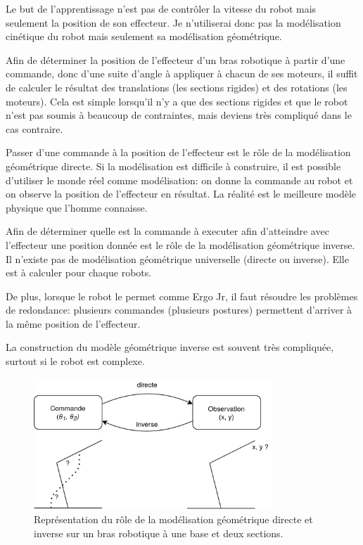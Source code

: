 \documentclass[11pt,french]{report}
\begin{document}
Le but de l'apprentissage n'est pas de contrôler la vitesse du robot mais seulement la position de son effecteur.
Je n'utiliserai donc pas la modélisation cinétique du robot mais seulement sa modélisation géométrique.

\phantom{INVISIBLE LINE}

Afin de déterminer la position de l'effecteur d'un bras robotique à partir d'une commande, donc d'une suite d'angle à appliquer à chacun de ses moteurs, il suffit de calculer le résultat des translations (les sections rigides) et des rotations (les moteurs).
Cela est simple lorsqu'il n'y a que des sections rigides et que le robot n'est pas soumis à beaucoup de contraintes, mais deviens très compliqué dans le cas contraire.

Passer d'une commande à la position de l'effecteur est le rôle de la modélisation géométrique directe.
Si la modélisation est difficile à construire, il est possible d'utiliser le monde réel comme modélisation: on donne la commande au robot et on observe la position de l'effecteur en résultat.
La réalité est le meilleure modèle physique que l'homme connaisse.

\phantom{INVISIBLE LINE}

Afin de déterminer quelle est la commande à executer afin d'atteindre avec l'effecteur une position donnée est le rôle de la modélisation géométrique inverse.
Il n'existe pas de modélisation géométrique universelle (directe ou inverse).
Elle est à calculer pour chaque robots.

De plus, lorsque le robot le permet comme Ergo Jr, il faut résoudre les problèmes de redondance: plusieurs commandes (plusieurs postures) permettent d'arriver à la même position de l'effecteur.

La construction du modèle géométrique inverse est souvent très compliquée, surtout si le robot est complexe.

\begin{figure}
    \centering
    \includegraphics[height=140pt]{Modelisation_geometrique_diagram} 
    \caption{Représentation du rôle de la modélisation géométrique directe et inverse sur un bras robotique à une base et deux sections.}
    \label{fig:SchemaModelisation}
\end{figure}
\end{document}
